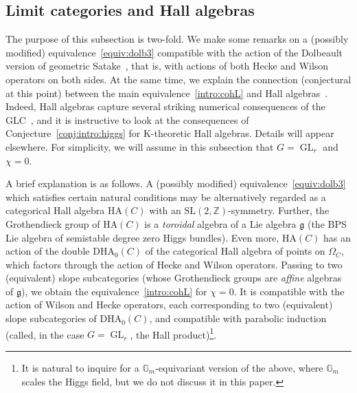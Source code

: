 \documentclass [11pt,oneside,a4paper,mathscr]{amsart}
\theoremstyle{definition}
\newcommand{\GL}{\operatorname{GL}}
\begin{document}
\subsection{Limit categories and Hall algebras}\label{subsec:KHA}

The purpose of this subsection is two-fold. We make some remarks on a (possibly modified) equivalence~\eqref{equiv:dolb3} compatible with the action of the Dolbeault version of geometric Satake~\cite{BFM, CW}, that is, with actions of both Hecke and Wilson operators on both sides. At the same time, we explain the connection (conjectural at this point) between the main equivalence~\eqref{intro:cohL} and Hall algebras~\cite{MR2944034, OSc, PoSa}. Indeed, Hall algebras capture several striking numerical consequences of the GLC~\cite{MR2944034, SV, OSc, KSV}, and it is instructive to look at the consequences of Conjecture~\ref{conj:intro:higgs} for K-theoretic Hall algebras. Details will appear elsewhere. For simplicity, we will assume in this subsection that $G=\GL_r$ and $\chi=0$.


A brief explanation is as follows. A (possibly modified) equivalence~\eqref{equiv:dolb3} which satisfies certain natural conditions may be alternatively regarded as a categorical Hall algebra $\text{HA}(C)$ with an $\text{SL}(2,\mathbb{Z})$-symmetry. Further, the Grothendieck group of $\text{HA}(C)$ is a \textit{toroidal} algebra of a Lie algebra $\mathfrak{g}$ (the BPS Lie algebra of semistable degree zero Higgs bundles). Even more, $\text{HA}(C)$ has an action of the double $\text{DHA}_0(C)$ of the categorical Hall algebra of points on $\Omega_C$, which factors through the action of Hecke and Wilson operators. 
Passing to two (equivalent) slope subcategories (whose Grothendieck groups are \textit{affine} algebras of $\mathfrak{g}$), we obtain the equivalence~\eqref{intro:cohL} for $\chi=0$. It is compatible with the action of Wilson and Hecke operators, each corresponding to two (equivalent) slope subcategories of $\text{DHA}_0(C)$, and compatible with parabolic induction (called, in the case $G=\GL_r$, the Hall product)\footnote{It is natural to inquire for a $\mathbb{G}_m$-equivariant version of the above, where $\mathbb{G}_m$ scales the Higgs field, but we do not discuss it in this paper.}.

\medskip

\end{document}
